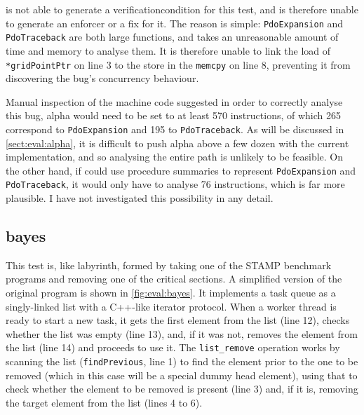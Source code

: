 {\Implementation} is not able to generate a
\gls{verificationcondition} for this test, and is therefore unable to
generate an enforcer or a fix for it.  The reason is simple:
\texttt{PdoExpansion} and \texttt{PdoTraceback} are both large
functions, and {\implementation} takes an unreasonable amount of time
and memory to analyse them.  It is therefore unable to link the load
of \texttt{*gridPointPtr} on line 3 to the store in the
\texttt{memcpy} on line 8, preventing it from discovering the bug's
concurrency behaviour.

Manual inspection of the machine code suggested in order to correctly
analyse this bug, \gls{alpha} would need to be set to at least 570
instructions, of which 265 correspond to \texttt{PdoExpansion} and 195
to \texttt{PdoTraceback}.  As will be discussed in
\autoref{sect:eval:alpha}, it is difficult to push \gls{alpha} above a
few dozen with the current implementation, and so analysing the entire
path is unlikely to be feasible.  On the other hand, if {\technique}
could use procedure summaries\needCite{} to represent
\texttt{PdoExpansion} and \texttt{PdoTraceback}, it would only have to
analyse 76 instructions, which is far more plausible.  I have not
investigated this possibility in any detail.

\subsection{bayes}

This test is, like labyrinth, formed by taking one of the STAMP
benchmark programs and removing one of the critical sections.  A
simplified version of the original program is shown in
\autoref{fig:eval:bayes}.  It implements a task queue as a
singly-linked list with a C++-like iterator protocol\needCite{}.  When
a worker thread is ready to start a new task, it gets the first
element from the list (line 12), checks whether the list was empty
(line 13), and, if it was not, removes the element from the list (line
14) and proceeds to use it.  The \texttt{list\_remove} operation works
by scanning the list (\texttt{findPrevious}, line 1) to find the
element prior to the one to be removed (which in this case will be a
special dummy head element), using that to check whether the element
to be removed is present (line 3) and, if it is, removing the target
element from the list (lines 4 to 6).

